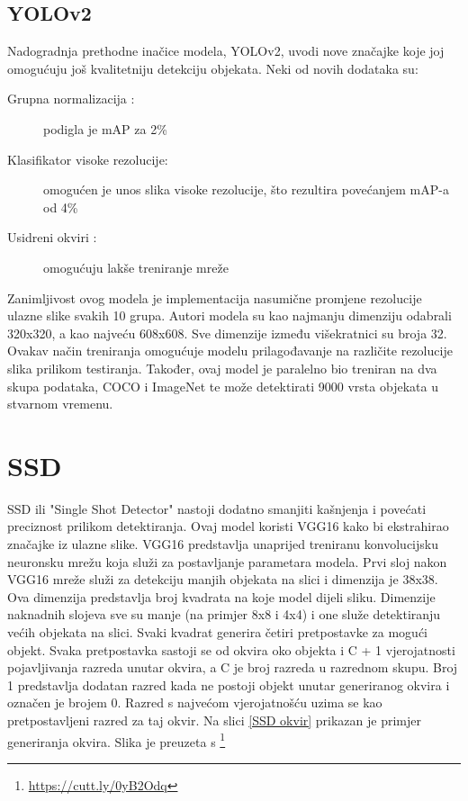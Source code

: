 \subsection{YOLOv2}
Nadogradnja prethodne inačice modela, YOLOv2, uvodi nove značajke koje joj omogućuju još kvalitetniju detekciju objekata.\newline
Neki od novih dodataka su:
\begin{description}
    \item [Grupna normalizacija :]podigla je mAP za 2\%
    \item [Klasifikator visoke rezolucije:]omogućen je unos slika visoke rezolucije, što rezultira povećanjem mAP-a od 4\%
    \item [Usidreni okviri :]omogućuju lakše treniranje mreže
\end{description}

Zanimljivost ovog modela je implementacija nasumične promjene rezolucije ulazne slike svakih 10 grupa.
Autori modela su kao najmanju dimenziju odabrali 320x320, a 
kao najveću 608x608. Sve dimenzije između višekratnici su broja 32. \newline
Ovakav način treniranja omogućuje modelu prilagođavanje na različite rezolucije 
slika prilikom testiranja. \newline
Također, ovaj model je paralelno bio treniran na dva skupa podataka, COCO i ImageNet te može 
detektirati 9000 vrsta objekata u stvarnom vremenu. \citep{DBLP:journals/corr/RedmonF16}


\section{SSD}
SSD ili "Single Shot Detector" nastoji dodatno smanjiti kašnjenja i povećati preciznost prilikom detektiranja. 
Ovaj model koristi VGG16 kako bi ekstrahirao značajke iz ulazne slike. VGG16 predstavlja unaprijed treniranu konvolucijsku neuronsku mrežu koja služi za postavljanje 
parametara modela. 
Prvi sloj nakon VGG16 mreže služi za detekciju manjih objekata na slici i dimenzija je 38x38. Ova dimenzija predstavlja broj kvadrata na koje model dijeli sliku. 
Dimenzije naknadnih slojeva sve su manje (na primjer 8x8 i 4x4) i one služe detektiranju većih objekata na slici. 
Svaki kvadrat generira četiri pretpostavke za mogući objekt. Svaka pretpostavka sastoji se od okvira oko objekta 
i C + 1 vjerojatnosti pojavljivanja razreda unutar okvira, a C je broj razreda u razrednom skupu. Broj 1 predstavlja dodatan razred
kada ne postoji objekt unutar generiranog okvira i označen je brojem 0. Razred s najvećom vjerojatnošću uzima se kao pretpostavljeni razred 
za taj okvir. Na slici \ref{SSD okvir} prikazan je primjer generiranja okvira. Slika je preuzeta s \footnote{\url{https://cutt.ly/0yB2Odq}}


